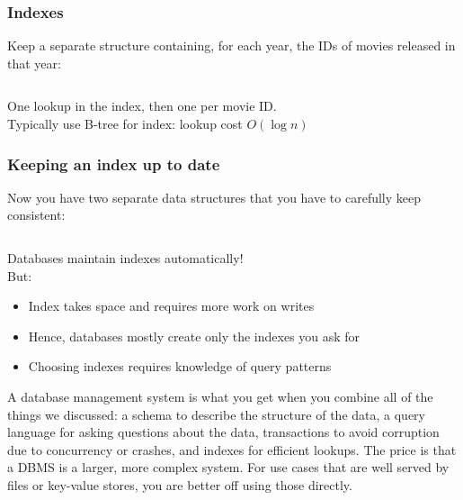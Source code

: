 \begin{frame}
    \label{s:indexes}
    \frametitle{Indexes}
    Keep a separate structure containing, for each year, the IDs of movies released in that year:
    \inputminted[fontsize=\footnotesize]{python}{code/index-python.py}
    \vspace{0.4em}
    One lookup in the index, then one per movie ID.\\
    Typically use B-tree for index: lookup cost $O(\log n)$
\end{frame}
\label{l:indexes}

\begin{frame}
    \label{s:index-maintenance}
    \frametitle{Keeping an index up to date}
    Now you have two separate data structures that you have to carefully keep consistent:
    \inputminted[fontsize=\footnotesize]{python}{code/index-maintain-python.py}
    \vspace{0.5em}\pause
    Databases maintain indexes automatically!\\[1em]
    But:
    \begin{itemize}
        \item Index takes space and requires more work on writes
        \item Hence, databases mostly create only the indexes you ask for
        \item Choosing indexes requires knowledge of query patterns
    \end{itemize}
\end{frame}
\label{l:index-maintenance}

A database management system is what you get when you combine all of the things we discussed: a schema to describe the structure of the data, a query language for asking questions about the data, transactions to avoid corruption due to concurrency or crashes, and indexes for efficient lookups.
The price is that a DBMS is a larger, more complex system.
For use cases that are well served by files or key-value stores, you are better off using those directly.

